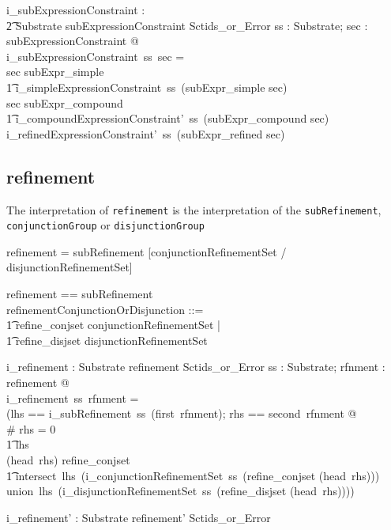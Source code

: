 \documentclass{article}
\def\spec#1{{\tt #1}}
\def\bnf#1{{\scriptsize {{#1}} }}
\begin{document}
\begin{gendef}
   i\_subExpressionConstraint : \\
\t2 Substrate \fun subExpressionConstraint \fun Sctids\_or\_Error
\where
   \forall ss : Substrate; sec : subExpressionConstraint @ \\
i\_subExpressionConstraint~ss~sec = \\
   \IF sec \in \ran subExpr\_simple \\
\t1 \THEN i\_simpleExpressionConstraint~ss~(subExpr\_simple \inv sec) \\
    \ELSE \IF sec \in \ran subExpr\_compound \\
\t1 \THEN i\_compoundExpressionConstraint'~ss~(subExpr\_compound \inv sec) \\
    \ELSE i\_refinedExpressionConstraint'~ss~(subExpr\_refined \inv sec) 
\end{gendef}

\subsection{refinement}
The interpretation of \spec{refinement} is the interpretation of the \spec{subRefinement}, \spec{conjunctionGroup} or \spec{disjunctionGroup}
\begin{framed}
\noindent
\bnf{refinement = subRefinement [conjunctionRefinementSet / disjunctionRefinementSet]}
\end{framed}

\begin{zed}
refinement == subRefinement \cross \optional[refinementConjunctionOrDisjunction] \\
[refinement']
\also
refinementConjunctionOrDisjunction ::= \\
\t1 refine\_conjset \ldata conjunctionRefinementSet \rdata | \\
\t1 refine\_disjset \ldata disjunctionRefinementSet \rdata
\end{zed}




\begin{gendef}
   i\_refinement : Substrate \fun refinement \fun Sctids\_or\_Error
\where
   \forall ss : Substrate; rfnment : refinement @ \\
    i\_refinement~ss~rfnment = \\
   (\LET lhs == i\_subRefinement~ss~(first~rfnment); rhs == second~rfnment @ \\
   \IF \# rhs = 0 \\
\t1 \THEN lhs \\
    \ELSE \IF (head~rhs) \in \ran refine\_conjset \\
\t1 \THEN intersect~lhs~(i\_conjunctionRefinementSet~ss~(refine\_conjset \inv (head~rhs))) \\
  \ELSE union~lhs~(i\_disjunctionRefinementSet~ss~(refine\_disjset \inv (head~rhs))))
\end{gendef}
\begin{gendef}
   i\_refinement' : Substrate \fun refinement' \fun Sctids\_or\_Error
\end{gendef}
\end{document}
